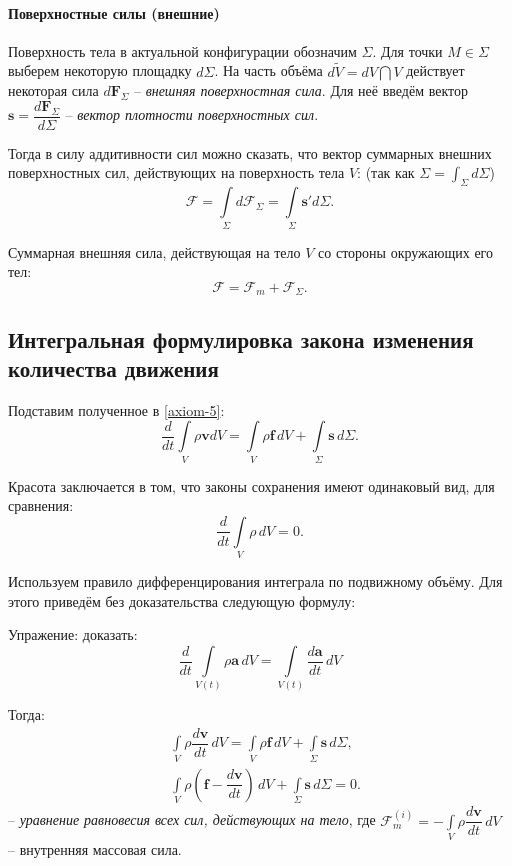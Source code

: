 \paragraph{Поверхностные силы (внешние)}
Поверхность тела в актуальной конфигурации обозначим $\Sigma$. Для точки $M \in \Sigma$
выберем некоторую площадку $d\Sigma$. На часть объёма $d\tilde{V} = dV \bigcap V$
действует некоторая сила $d\mathbf{F}_\Sigma$ -- \emph{внешняя поверхностная сила}.
Для неё введём вектор $\mathbf{s} = \dfrac{d\mathbf{F}_\Sigma}{d\Sigma}$
-- \emph{вектор плотности поверхностных сил}.

Тогда в силу аддитивности сил можно сказать, что вектор суммарных внешних
поверхностных сил, действующих на поверхность тела $V$: (так как
$\Sigma = \int_\Sigma d\Sigma$)
\[
  \mathbf{\mathcal{F}} = \int\limits_\Sigma d\mathbf{\mathcal{F}}_\Sigma 
  = \int\limits_\Sigma \mathbf{s}' d\Sigma.
\]

Суммарная внешняя сила, действующая на тело $V$ со стороны окружающих его тел:
\[
  \mathbf{\mathcal{F}} = \mathbf{\mathcal{F}}_m + \mathbf{\mathcal{F}}_\Sigma.
\]


\subsection{Интегральная формулировка закона изменения количества движения}
Подставим полученное в \eqref{axiom-5}:
\begin{equation}\label{integral-form-I}
  \dfrac{d}{dt} \int\limits_V \rho \mathbf{v} dV =
  \int\limits_V \rho \mathbf{f} \, dV + \int\limits_\Sigma \mathbf{s} \, d\Sigma.
\end{equation}

Красота заключается в том, что законы сохранения имеют одинаковый вид, для
сравнения:
\[
  \dfrac{d}{dt} \int\limits_V \rho \, dV = 0.
\]

Используем правило дифференцирования интеграла по подвижному объёму. Для этого 
приведём без доказательства следующую формулу:

Упражение: доказать:
\[
  \dfrac{d}{dt} \int\limits_{V(t)} \rho \mathbf{a} \, dV =
  \int\limits_{V(t)} \dfrac{d\mathbf{a}}{dt} \, dV
\]

Тогда:
\begin{align*}
  &\int\limits_V \rho \dfrac{d\mathbf{v}}{dt} \, dV = \int\limits_V \rho \mathbf{f} \, dV
  + \int\limits_\Sigma \mathbf{s} \, d\Sigma, \\
  &\int\limits_V \rho \left( \mathbf{f} - \dfrac{d\mathbf{v}}{dt} \right) \, dV
  + \int\limits_\Sigma \mathbf{s} \, d\Sigma = 0.
\end{align*}
-- \emph{уравнение равновесия всех сил, действующих на тело}, где 
$\mathbf{\mathcal{F}}^{(i)}_{m} = - \int\limits_V \rho \dfrac{d\mathbf{v}}{dt} \, dV$
-- внутренняя массовая сила.



